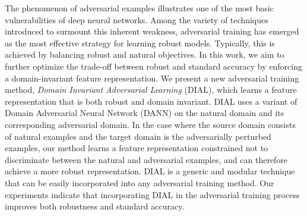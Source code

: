 The phenomenon of adversarial examples illustrates one of the most basic vulnerabilities of deep neural networks. Among the variety of techniques introduced to surmount this inherent weakness, adversarial training has emerged as the most effective strategy for learning robust models. Typically, this is achieved by balancing robust and natural objectives. In this work, we aim to further optimize the trade-off between robust and standard accuracy by enforcing a domain-invariant feature representation. We present a new adversarial training method, \textit{Domain Invariant Adversarial Learning} (DIAL), which learns a feature representation that is both robust and domain invariant. DIAL uses a variant of Domain Adversarial Neural Network (DANN) on the natural domain and its corresponding adversarial domain. In the case where the source domain consists of natural examples and the target domain is the adversarially perturbed examples, our method learns a feature representation constrained not to discriminate between the natural and adversarial examples, and can therefore achieve a more robust representation. DIAL is a generic and modular technique that can be easily incorporated into any adversarial training method. Our experiments indicate that incorporating DIAL in the adversarial training process improves both robustness and standard accuracy.
